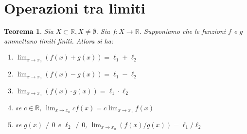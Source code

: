 \documentclass[11pt]{book}
\newtheorem{theorem}{Teorema}[chapter]
\begin{document}
\section{Operazioni tra limiti}
\begin{theorem}
    Sia $X\subset\mathbb{R},X\neq\emptyset$. Sia $f:X\rightarrow\mathbb{R}$. Supponiamo che le funzioni $f$ e $g$ 
    ammettano limiti finiti. Allora si ha:
    \begin{enumerate}
        \item $\lim_{x\rightarrow x_0}(f(x)+g(x))=\ell_1+\ell_2$
        \item $\lim_{x\rightarrow x_0}(f(x)-g(x))=\ell_1-\ell_2$
        \item $\lim_{x\rightarrow x_0}(f(x)\cdot g(x))=\ell_1\cdot \ell_2$
        \item se $c\in\mathbb{R}$, $\lim_{x\rightarrow x_0}cf(x)=c\lim_{x\rightarrow x_0}f(x)$
        \item se $g(x)\neq 0$ e $\ell_2\neq 0$, $\lim_{x\rightarrow x_0}(f(x)/g(x))=\ell_1/\ell_2$
    \end{enumerate}
\end{theorem}
\end{document}
